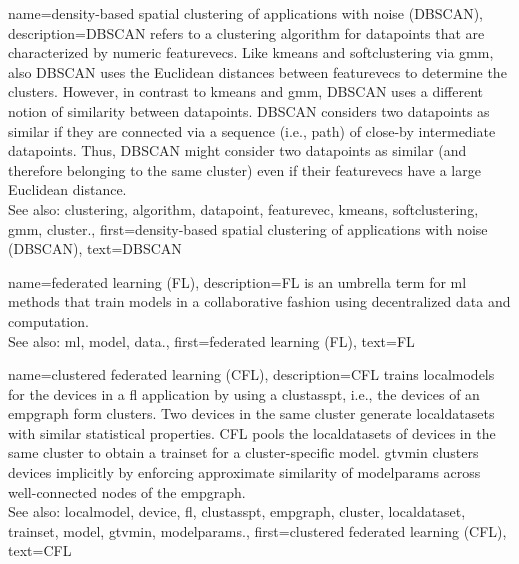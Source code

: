 {name={density-based spatial clustering of applications with noise (DBSCAN)}, 
	description={DBSCAN refers to a \gls{clustering} \gls{algorithm} for \glspl{datapoint} that are characterized by numeric \glspl{featurevec}. 
		Like \gls{kmeans} and \gls{softclustering} via \gls{gmm}, also DBSCAN uses the Euclidean 
		distances between \glspl{featurevec} to determine the \glspl{cluster}. However, in contrast to \gls{kmeans} 
		and \gls{gmm}, DBSCAN uses a different notion of similarity between \glspl{datapoint}. 
		DBSCAN considers two \glspl{datapoint} as similar if they are connected 
		via a sequence (i.e., path) of close-by intermediate \glspl{datapoint}. Thus, DBSCAN might consider 
		two \glspl{datapoint} as similar (and therefore belonging to the same cluster) even if 
		their \glspl{featurevec} have a large Euclidean distance.
				\\
		See also: \gls{clustering}, \gls{algorithm}, \gls{datapoint}, \gls{featurevec}, \gls{kmeans}, \gls{softclustering}, \gls{gmm}, \gls{cluster}.},
	first={density-based spatial clustering of applications with noise (DBSCAN)},
	text={DBSCAN} 
}

{name={federated learning (FL)}, 
	description={FL 
		is an umbrella term for \gls{ml} methods that train \glspl{model} in a collaborative 
		fashion using decentralized \gls{data} and computation.
				\\
		See also: \gls{ml}, \gls{model}, \gls{data}.},
	first={federated learning (FL)},
	text={FL} 
}
	
{name={clustered federated learning (CFL)}, 
	description={CFL trains \glspl{localmodel} for the 
 		\glspl{device} in a \gls{fl} application by using a \gls{clustasspt}, i.e., the \glspl{device} 
 		of an \gls{empgraph} form \glspl{cluster}. Two \glspl{device} in the same \gls{cluster} generate 
 		\glspl{localdataset} with similar statistical properties. CFL pools the \glspl{localdataset} of \glspl{device} 
 		in the same \gls{cluster} to obtain a \gls{trainset} for a \gls{cluster}-specific \gls{model}. 
 		\Gls{gtvmin} clusters \glspl{device} implicitly by enforcing approximate similarity of \gls{modelparams} 
 		across well-connected nodes of the \gls{empgraph}.\\ 
 		See also: \gls{localmodel}, \gls{device}, \gls{fl}, \gls{clustasspt}, \gls{empgraph}, \gls{cluster}, \gls{localdataset}, \gls{trainset}, \gls{model}, \gls{gtvmin}, \gls{modelparams}.},
	first={clustered federated learning (CFL)},
	text={CFL} 
}

